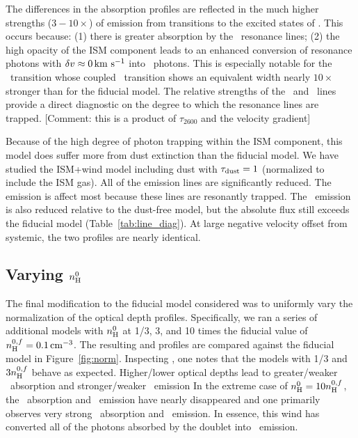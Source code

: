 \documentclass[12pt,preprint]{aastex}
\begin{document}
The differences in the  absorption profiles are reflected
in the much higher strengths ($3-10\times$) of emission from
transitions to the excited states of \aconfig.   This occurs because:
(1) there is greater absorption by the \feiid\
resonance lines; (2) the high opacity of the ISM component leads to
an enhanced conversion of resonance photons with $\delta v \approx 0\, {\rm km~s^{-1}}$
into \feiis\ photons.  This is especially notable for the
\feiib\ transition whose coupled \feiis\ transition shows an equivalent width nearly
$10\times$ stronger than for the fiducial model.  The relative
strengths of the \feiib\ and \feiie\ lines provide a direct
diagnostic on the degree to which the resonance lines are trapped.
[Comment:  this is a product of $\tau_{2600}$ and the velocity
gradient]

Because of the high degree of photon trapping within the ISM
component, this model does suffer more from dust extinction than the
fiducial model.  We have studied the ISM+wind model including dust
with $\tau_{\rm dust}=1$ (normalized to include the ISM gas).  All of the 
emission lines are significantly reduced.  The \ion{Mg}{2} emission is
affect most because these lines are resonantly trapped.  The \feiis\
emission is also reduced relative to the dust-free model, but the
absolute flux still exceeds the fiducial model
(Table~\ref{tab:line_diag}).  At large negative velocity offset from
systemic, the two profiles are nearly identical.

\subsection{Varying $n_{\rm H}^0$}

The final modification to the fiducial model considered was to
uniformly vary the normalization of the optical depth profiles.
Specifically, we ran a series of additional models with $n_{\rm H}^0$ at
1/3, 3, and 10 times the fiducial value of $n_{\rm H}^{0,f} = 0.1 \, {\rm cm^{-3}}$.
The resulting  and \ion{Fe}{2} profiles are compared
against the fiducial model in Figure~\ref{fig:norm}.  Inspecting
\ion{Mg}{2}, one notes that the models with 1/3 and $3 n_{\rm H}^{0,f}$
behave as expected.  Higher/lower optical depths lead to
greater/weaker \mgiia\ absorption and stronger/weaker \mgiib\ emission
In the extreme case of
$n_{\rm H}^0 = 10 n_{\rm H}^{0,f}$, the \mgiib\ absorption and \mgiia\
emission have nearly disappeared and one primarily observes very
strong \mgiia\ absorption and \mgiib\ emission.
In essence, this wind has converted all of the photons absorbed by the
\ion{Mg}{2} doublet into \mgiib\ emission.
\end{document}
